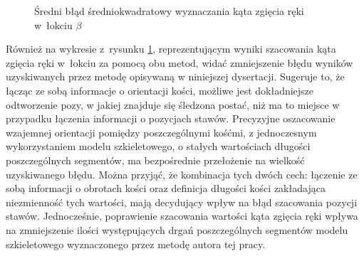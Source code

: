 																															
\begin{savenotes}
	\begin{figure}[!htb]
		\centering
		\caption{Średni błąd średniokwadratowy wyznaczania kąta zgięcia ręki w~łokciu $\beta$}
		\label{fig:experiments:angle:summary}
	\end{figure}
\end{savenotes}


Również na wykresie z~rysunku \ref{fig:experiments:angle:summary}, reprezentującym wyniki szacowania kąta zgięcia ręki w~łokciu za pomocą obu metod, widać zmniejszenie błędu wyników uzyskiwanych przez metodę opisywaną w niniejszej dysertacji. Sugeruje to, że łącząc ze sobą informacje o orientacji kości, możliwe jest dokładniejsze odtworzenie pozy, w jakiej znajduje się śledzona postać, niż ma to miejsce w przypadku łączenia informacji o pozycjach stawów. Precyzyjne oszacowanie wzajemnej orientacji pomiędzy poszczególnymi kośćmi, z jednoczesnym wykorzystaniem modelu szkieletowego, o stałych wartościach długości poszczególnych segmentów, ma bezpośrednie przełożenie na wielkość uzyskiwanego błędu. Można przyjąć, że kombinacja tych dwóch cech: łączenie ze sobą informacji o obrotach kości oraz definicja długości kości zakładająca niezmienność tych wartości, mają decydujący wpływ na błąd szacowania pozycji stawów. Jednocześnie, poprawienie szacowania wartości kąta zgięcia ręki wpływa na zmniejszenie ilości występujących drgań poszczególnych segmentów modelu szkieletowego wyznaczonego przez metodę autora tej pracy.